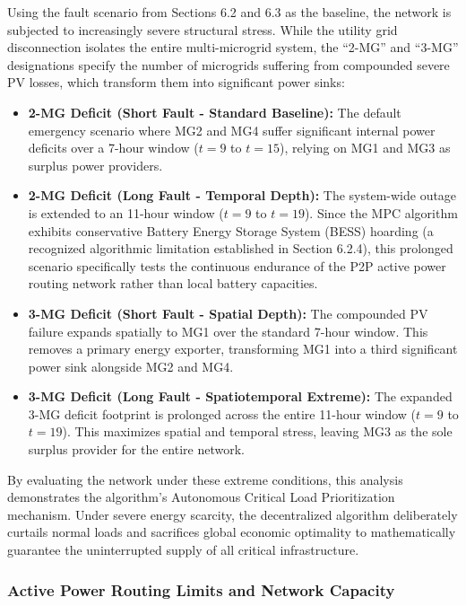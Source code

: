 Using the fault scenario from Sections 6.2 and 6.3 as the baseline, the network is subjected to increasingly severe structural stress. While the utility grid disconnection isolates the entire multi-microgrid system, the ``2-MG'' and ``3-MG'' designations specify the number of microgrids suffering from compounded severe PV losses, which transform them into significant power sinks:
\begin{itemize}
    \item \textbf{2-MG Deficit (Short Fault - Standard Baseline):} The default emergency scenario where MG2 and MG4 suffer significant internal power deficits over a 7-hour window ($t=9$ to $t=15$), relying on MG1 and MG3 as surplus power providers.
    \item \textbf{2-MG Deficit (Long Fault - Temporal Depth):} The system-wide outage is extended to an 11-hour window ($t=9$ to $t=19$). Since the MPC algorithm exhibits conservative Battery Energy Storage System (BESS) hoarding (a recognized algorithmic limitation established in Section 6.2.4), this prolonged scenario specifically tests the continuous endurance of the P2P active power routing network rather than local battery capacities.
    \item \textbf{3-MG Deficit (Short Fault - Spatial Depth):} The compounded PV failure expands spatially to MG1 over the standard 7-hour window. This removes a primary energy exporter, transforming MG1 into a third significant power sink alongside MG2 and MG4.
    \item \textbf{3-MG Deficit (Long Fault - Spatiotemporal Extreme):} The expanded 3-MG deficit footprint is prolonged across the entire 11-hour window ($t=9$ to $t=19$). This maximizes spatial and temporal stress, leaving MG3 as the sole surplus provider for the entire network.
\end{itemize}

By evaluating the network under these extreme conditions, this analysis demonstrates the algorithm's Autonomous Critical Load Prioritization mechanism. Under severe energy scarcity, the decentralized algorithm deliberately curtails normal loads and sacrifices global economic optimality to mathematically guarantee the uninterrupted supply of all critical infrastructure.

\subsubsection{Active Power Routing Limits and Network Capacity}

